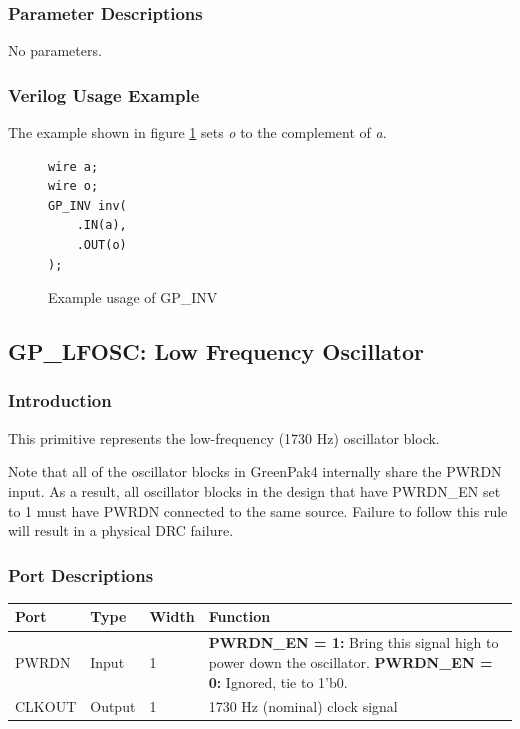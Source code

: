 \documentclass{article}
\begin{document}
\subsubsection{Parameter Descriptions}

No parameters.

\subsubsection{Verilog Usage Example}

The example shown in figure \ref{gp-inv-example} sets \emph{o} to the complement of \emph{a}.

\begin{figure}[h]
\begin{lstlisting}
wire a;
wire o;
GP_INV inv(
	.IN(a),
	.OUT(o)
);
\end{lstlisting}
\caption{Example usage of GP\_INV}
\label{gp-inv-example}
\end{figure}


\pagebreak
\subsection{GP\_LFOSC: Low Frequency Oscillator}

\subsubsection{Introduction}
This primitive represents the low-frequency (1730 Hz) oscillator block.

Note that all of the oscillator blocks in GreenPak4 internally share the PWRDN input. As a result, all oscillator 
blocks in the design that have PWRDN\_EN set to 1 must have PWRDN connected to the same source. Failure to follow this 
rule will result in a physical DRC failure.

\subsubsection{Port Descriptions}

\begin{tabularx}{5in}{|l|l|l|X|}
\hline
{\bfseries Port} & {\bfseries Type} & {\bfseries Width} & {\bfseries Function} \\
\hline
PWRDN & Input & 1 &
	{\bfseries PWRDN\_EN = 1:} \newline Bring this signal high to power down the oscillator. \newline
	{\bfseries PWRDN\_EN = 0:} \newline Ignored, tie to 1'b0.\\
\hline
CLKOUT & Output & 1 & 1730 Hz (nominal) clock signal \\
\hline
\end{tabularx}
\end{document}

